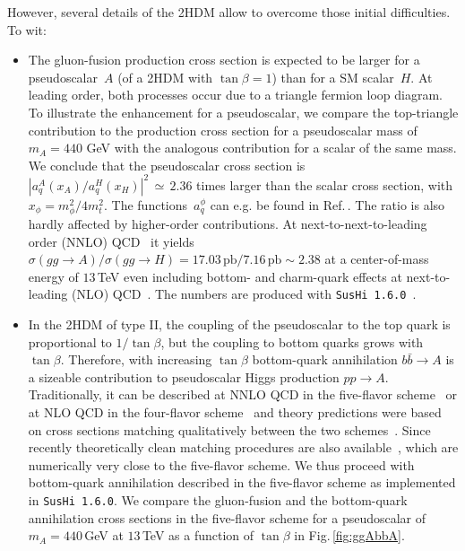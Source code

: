 \documentclass[12pt]{article}
\newcommand{\citere}[1]{Ref.\,\cite{#1}}
\newcommand{\code}{\tt}
\newcommand{\sushi}[1]{{\code SusHi #1}}
\newcommand{\abbrev}{\scalefont{.9}}
\newcommand{\fig}[1]{Fig.\,\ref{#1}}
\newcommand{\qcd}{{\abbrev QCD}}
\newcommand{\sm}{{\abbrev SM}}
\newcommand{\thdm}{{\abbrev 2HDM}}
\newcommand{\nlo}{{\abbrev NLO}}
\newcommand{\nnlo}{{\abbrev NNLO}}
\begin{document}
However, several details of the \thdm{} allow to overcome those initial difficulties. To wit:
%
\begin{itemize}
%
\item The gluon-fusion production cross section is expected to be larger for a pseudoscalar~$A$ (of a \thdm{} with $\tan\beta=1$) than for a \sm{} scalar~$H$.
At leading order, both processes occur due to a triangle fermion loop diagram.
To illustrate the enhancement for a pseudoscalar, we compare the top-triangle contribution to the production cross section for a pseudoscalar mass of $m_A = 440$ GeV with the analogous contribution for a scalar of the same mass.
We conclude that the pseudoscalar cross section is $|a^A_q(x_A)/a^H_q(x_H)|^2\,\simeq\,2.36$ times larger than the scalar cross section, with $x_\phi = m_\phi^2/4 m_t^2$.
The  functions~$a_q^\phi$ can e.g. be found in \citere{Harlander:2012pb}. The ratio is also hardly affected by higher-order contributions.
At next-to-next-to-leading order (\nnlo{}) \qcd{}~\cite{Harlander:2002wh,Anastasiou:2002yz,Ravindran:2003um,Harlander:2002vv,Anastasiou:2002wq} it yields $\sigma(gg\to A)/\sigma(gg\to H)=17.03\,\text{pb}/7.16\,\text{pb}\sim 2.38$ at a center-of-mass energy of $13$\,TeV even including bottom- and charm-quark effects at next-to-leading (\nlo{}) \qcd{}~\cite{Spira:1995rr}.
The numbers are produced with \sushi{1.6.0}~\cite{Harlander:2012pb,Harlander:2016hcx}.
%
\item In the \thdm{} of type II, the coupling of the pseudoscalar to the top quark is proportional to $1/\tan\beta$, but the coupling to bottom quarks grows with $\tan\beta$.
Therefore, with increasing $\tan\beta$ bottom-quark annihilation $b\bar b\to A$ is a sizeable contribution to pseudoscalar Higgs production $pp\to A$.
Traditionally, it can be described at \nnlo{} \qcd{} in the five-flavor scheme~\cite{Harlander:2003ai} or at \nlo{} \qcd{} in the four-flavor scheme~\cite{Dittmaier:2003ej,Dawson:2003kb} and theory predictions were based on cross sections matching qualitatively between the two schemes~\cite{Harlander:2011aa}.
Since recently theoretically clean matching procedures are also available~\cite{Bonvini:2015pxa,Bonvini:2016fgf,Forte:2015hba,Forte:2016sja}, which are numerically very close to the five-flavor
scheme.
We thus proceed with bottom-quark annihilation described in the five-flavor scheme as implemented in \sushi{1.6.0}.
We compare the gluon-fusion and the bottom-quark annihilation cross sections in the five-flavor scheme for a pseudoscalar of $m_A=440$\,GeV at $13$\,TeV as a function of $\tan\beta$ in \fig{fig:ggAbbA}.

\end{itemize}
\end{document}
